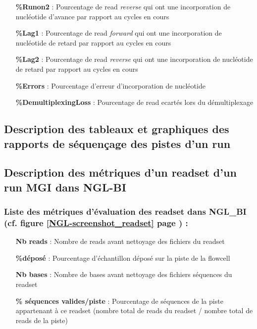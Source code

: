 \begin{itemize}
    \item[\textbf{\%Runon2} :] Pourcentage de read \emph{reverse} qui ont une incorporation de nucléotide d'avance par rapport au cycles en cours
    \item[\textbf{\%Lag1} :] Pourcentage de read \emph{forward} qui ont une incorporation de nucléotide de retard par rapport au cycles en cours
    \item[\textbf{\%Lag2} :] Pourcentage de read \emph{reverse} qui ont une incorporation de nucléotide de retard par rapport au cycles en cours
    \item[\textbf{\%Errors} :] Pourcentage d'erreur d'incorporation de nucléotide
    \item[\textbf{\%DemultiplexingLoss} :] Pourcentage de read ecartés lors du démultiplexage
\end{itemize}

\subsection*{Description des tableaux et graphiques des rapports de séquençage des pistes d'un run}
\label{anexes2}


\subsection*{Description des métriques d'un readset d'un run MGI dans NGL-BI}
\label{anexes3}
\subsubsection*{Liste des métriques d'évaluation des readset dans NGL\_BI (cf. figure \ref{NGL-screenshot_readset} page \pageref{NGL-screenshot_readset}) : }
\begin{itemize}
    \item[\textbf{Nb reads} :] Nombre de reads avant nettoyage des fichiers du readset
    \item[\textbf{\%déposé} :] Pourcentage d'échantillon déposé sur la piste de la flowcell
    \item[\textbf{Nb bases} :] Nombre de bases avant nettoyage des fichiers séquences du readset
    \item[\textbf{\% séquences valides/piste} :] Pourcentage de séquences de la piste appartenant à ce readset (nombre total de reads du readset / nombre total de reads de la piste)
\end{itemize}

